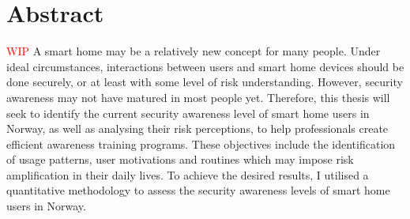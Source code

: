 \chapter*{Abstract}
\textcolor{red}{WIP}
A smart home may be a relatively new concept for many people. Under ideal circumstances, interactions between users and smart home devices should be done securely, or at least with some level of risk understanding. However, security awareness may not have matured in most people yet. Therefore, this thesis will seek to identify the current security awareness level of smart home users in Norway, as well as analysing their risk perceptions, to help professionals create efficient awareness training programs. These objectives include the identification of usage patterns, user motivations and routines which may impose risk amplification in their daily lives. To achieve the desired results, I utilised a quantitative methodology to assess the security awareness levels of smart home users in Norway.

\begin{comment}
The \texttt{ntnuthesis} document class is a customised version of the standard \LaTeX{} \texttt{report} document class. It can be used for theses at all levels – bachelor, master and PhD – and is available in English (British and American) and Norwegian (Bokmål and Nynorsk). This document is ment to serve (i) as a description of the document class, (ii) as an example of how to use it, and (iii) as a thesis template.
\end{comment}
